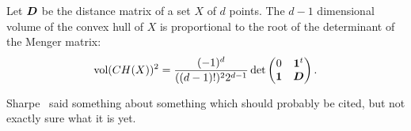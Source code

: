 \begin{lemma}
	Let $\vb*{D}$ be the distance matrix of a set $X$ of $d$ points. The $d-1$ dimensional volume of the convex hull of $X$ is proportional to the root of the determinant of the Menger matrix: 
	\begin{equation*}
	\textnormal{vol}(CH(X))^2 = \frac{(-1)^d}{((d-1)!)^2 2^{d-1}} \det\begin{pmatrix}
	0 & \vb{1}^t \\
	\vb{1} & \vb*{D}
	\end{pmatrix}.
	\end{equation*} 
\end{lemma}

Sharpe~\cite{sharpe1967theorem} said something about something which should probably be cited, but not exactly sure what it is yet. 




